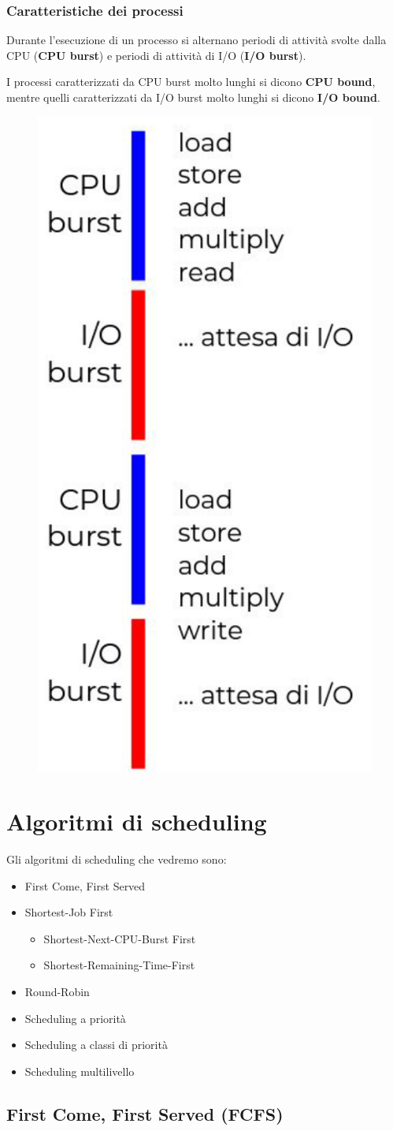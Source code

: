 \subsubsection{Caratteristiche dei processi}
Durante l'esecuzione di un processo si alternano periodi di attività svolte dalla CPU (\textbf{CPU burst}) e periodi di attività di I/O (\textbf{I/O burst}).

I processi caratterizzati da CPU burst molto
lunghi si dicono \textbf{CPU bound}, mentre quelli caratterizzati da I/O burst molto lunghi si dicono \textbf{I/O bound}.

\begin{figure} [h]
    \centering
    \includegraphics[width=0.2\linewidth]{Images/Screenshot 2024-12-23 at 14-20-04 so-02.1-scheduling - so-02.1-scheduling.pdf.png}
\end{figure}

\section{Algoritmi di scheduling}
Gli algoritmi di scheduling che vedremo sono:
\begin{itemize}
    \item First Come, First Served
    \item Shortest-Job First
    \begin{itemize}
        \item Shortest-Next-CPU-Burst First
        \item Shortest-Remaining-Time-First
    \end{itemize}
    \item Round-Robin
    \item Scheduling a priorità
    \item Scheduling a classi di priorità
    \item Scheduling multilivello
\end{itemize}

\subsection{First Come, First Served (FCFS)}
